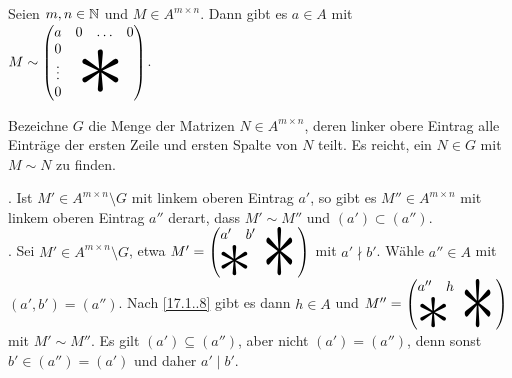 \documentclass[../../main.tex]{subfiles}
\begin{document}
\begin{lem}\label{17.1.9}
    Seien $m,n\in \mathbb N$ und $M\in A^{m\times n}$. Dann gibt es $a\in A$ mit\\ $M\sim\begin{pmatrix}a&0&\hdots&0\\
        0&&&\\\vdots&&
        \begin{tikzpicture}[overlay]\node[xshift=-0.3em,yshift=0.5em,scale=7]{$*$};\end{tikzpicture}&\\
        0&&&
    \end{pmatrix}$.
\end{lem}
\begin{cproof}
    Bezeichne $G$ die Menge der Matrizen $N\in A^{m\times n}$, deren linker obere Eintrag alle Einträge der ersten Zeile und ersten Spalte von $N$ teilt. Es reicht, ein $N\in G$ mit $M\sim N$ zu finden.\\

    \begin{behbox}
        \hbeh{}. Ist $M'\in A^{m\times n}\setminus G$ mit linkem oberen Eintrag $a'$, so gibt es $M''\in A^{m\times n}$ mit linkem oberen Eintrag $a''$ derart, dass $M'\sim M''$ und $(a')\subset (a'')$.\\

        \hbeg{}. Sei $M'\in A^{m\times n}\setminus G$, etwa $M'=\begin{pmatrix}a'&b'&&\begin{tikzpicture}[overlay]\node[xshift=-0.3em,yshift=-1em,yscale=8,xscale=5]{$*$};\end{tikzpicture}&\\&&&&\\\begin{tikzpicture}[overlay]\node[xshift=0.6em,yshift=0.8em,scale=5]{$*$};\end{tikzpicture}&&&\end{pmatrix}$ mit $a'\nmid b'$. Wähle $a''\in A$ mit $(a',b')=(a'')$. Nach \ref{17.1..8} gibt es dann $h\in A$ und $M''=\begin{pmatrix}a''&h&&\begin{tikzpicture}[overlay]\node[xshift=-0.3em,yshift=-1em,yscale=8,xscale=5]{$*$};\end{tikzpicture}&\\&&&&\\\begin{tikzpicture}[overlay]\node[xshift=0.6em,yshift=0.8em,scale=5]{$*$};\end{tikzpicture}&&&\end{pmatrix}$ mit $M'\sim M''$. Es gilt $(a')\subseteq (a'')$, aber nicht $(a')=(a'')$, denn sonst $b'\in(a'')=(a')$ und daher $a'\mid b'$.
    \end{behbox}


\end{cproof}
\end{document}

